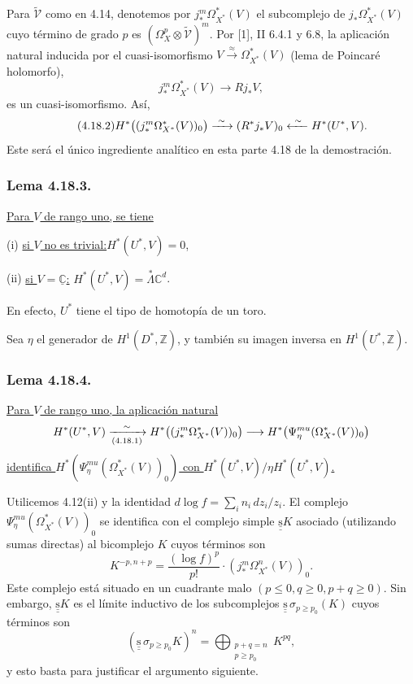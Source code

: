 Para $\widetilde{\mathcal V}$ como en 4.14, denotemos por
$j_*^m\Omega_{X^*}^*(V)$ el subcomplejo de
$j_*\Omega_{X^*}^*(V)$ cuyo término de grado $p$ es
$(\Omega_X^p\otimes\widetilde{\mathcal V})^m$. Por [1], II 6.4.1 y
6.8, la aplicación natural inducida por el cuasi-isomorfismo
$V\xrightarrow{\ \approx\ }\Omega_{X^*}^*(V)$ (lema de Poincaré
holomorfo),
\begin{equation}\tag{4.18.1}
j_*^m\Omega_{X^*}^*(V)\longrightarrow Rj_*V,
\end{equation}
es un cuasi-isomorfismo. Así,
\begin{equation}\tag{4.18.2}
H^*\bigl((j_*^m\Omega_{X^*}^*(V))_0\bigr)
 \xrightarrow{\ \sim\ }(R^*j_*V)_0
 \xleftarrow{\ \sim\ }H^*(\sisi{U}{U^*},V).
\end{equation}
Este será el único ingrediente analítico en esta parte 4.18 de la
demostración.

\subsubsection*{Lema 4.18.3.}
\underline{Para $V$ de rango uno, se tiene}

\noindent\textup{(i)}\qquad
\underline{si $V$ no es trivial:}\quad $H^*(U^*,V)=0$,

\medskip

\pageoriginale

\noindent\textup{(ii)}\qquad
\underline{si $V=\underline{\mathbb C}$:}\quad
$H^*(U^*,V)=\stackrel{*}{\Lambda}\mathbb C^d$.

En efecto, $U^*$ tiene el tipo de homotopía de un toro.

Sea $\eta$ el generador de $H^1(D^*,\mathbb Z)$, y también su imagen
inversa en $H^1(U^*,\mathbb Z)$.

\subsubsection*{Lema 4.18.4.}
\underline{Para $V$ de rango uno, la aplicación natural}
\[
H^*(U^*,\sisi{\mathbb C}{V})
 \xrightarrow[(4.18.1)]{\ \sim\ }
H^*\bigl((j_*^m\Omega_{X^*}^*(V))_0\bigr)
 \longrightarrow
H^*\bigl(\Psi_\eta^{mu}(\Omega_{X^*}^*(V))_0\bigr)
\]
\underline{identifica
$H^*(\Psi_\eta^{mu}(\Omega_{X^*}^*(V))_0)$ con
$H^*(U^*,V)/\eta H^*(U^*,V)$.}

Utilicemos 4.12(ii) y la identidad
$d\log f=\sum_i n_i\,dz_i/z_i$. El complejo
$\Psi_\eta^{mu}(\Omega_{X^*}^*(V))_0$ se identifica con el complejo
simple $\underline{\underline{\mathrm{s}}}K$ asociado (utilizando sumas directas) al bicomplejo
$K$ cuyos términos son
\[
K^{-p,n+p}=\frac{(\log f)^p}{p!}\cdot
  (j_*^m\Omega_{X^*}^n(V))_0.
\]
Este complejo está situado en un cuadrante malo
$(p\leq0,q\geq0,p+q\geq0)$. Sin embargo, $\underline{\underline{\mathrm{s}}}K$ es el límite
inductivo de los subcomplejos $\underline{\underline{\mathrm{s}}}\,\sigma_{p\geq p_0}(K)$ cuyos
términos son
\[
(\underline{\underline{\mathrm{s}}}\,\sigma_{p\geq p_0}K)^n
=\bigoplus_{\substack{p+q=n\\p\geq p_0}}K^{pq},
\]
y esto basta para justificar el argumento siguiente.

